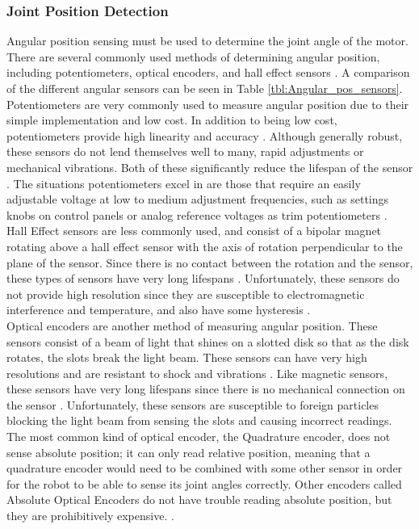 \subsubsection{Joint Position Detection}
Angular position sensing must be used to determine the joint angle of the motor. There are several commonly used methods of determining angular position, including potentiometers, optical encoders, and hall effect sensors \cite{Pot_vs_Sensor,Choose_Sensor_Technology,Choose_Position_Sensor}. A comparison of the different angular sensors can be seen in Table \ref{tbl:Angular_pos_sensors}. \\
\newline
Potentiometers are very commonly used to measure angular position due to their simple implementation and low cost. In addition to being low cost, potentiometers provide high linearity and accuracy \cite{Choose_Position_Sensor}. Although generally robust, these sensors do not lend themselves well to many, rapid adjustments or mechanical vibrations. Both of these significantly reduce the lifespan of the sensor \cite{Pot_vs_Sensor,Choose_Position_Sensor}. The situations potentiometers excel in are those that require an easily adjustable voltage at low to medium adjustment frequencies, such as settings knobs on control panels or analog reference voltages as trim potentiometers \cite{Pot_vs_Sensor}. \\
\newline
Hall Effect sensors are less commonly used, and consist of a bipolar magnet rotating above a hall effect sensor with the axis of rotation perpendicular to the plane of the sensor. Since there is no contact between the rotation and the sensor, these types of sensors have very long lifespans \cite{Pot_vs_Sensor}. Unfortunately, these sensors do not provide high resolution since they are susceptible to electromagnetic interference and temperature, and also have some hysteresis \cite{Choose_Position_Sensor}. \\
\newline
Optical encoders are another method of measuring angular position. These sensors consist of a beam of light that shines on a slotted disk so that as the disk rotates, the slots break the light beam. These sensors can have very high resolutions and are resistant to shock and vibrations \cite{Choose_Sensor_Technology}. Like magnetic sensors, these sensors have very long lifespans since there is no mechanical connection on the sensor \cite{Pot_vs_Sensor}. Unfortunately, these sensors are susceptible to foreign particles blocking the light beam from sensing the slots and causing incorrect readings. The most common kind of optical encoder, the Quadrature encoder, does not sense absolute position; it can only read relative position, meaning that a quadrature encoder would need to be combined with some other sensor in order for the robot to be able to sense its joint angles correctly. Other encoders called Absolute Optical Encoders do not have trouble reading absolute position, but they are prohibitively expensive. \cite{Choose_Position_Sensor}. 

